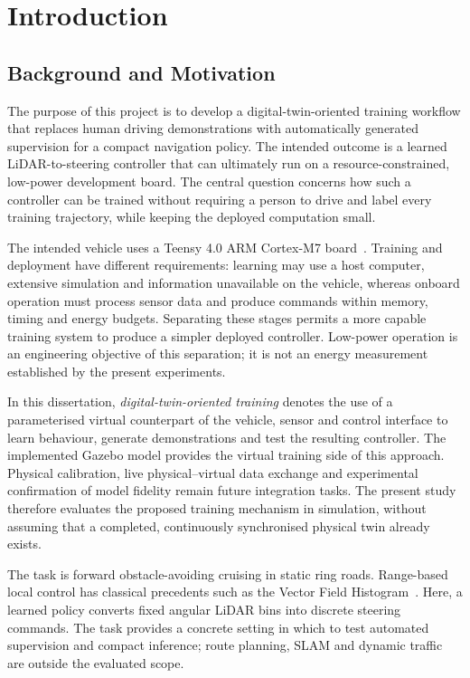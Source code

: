 \chapter{Introduction}
\label{ch:introduction}
\section{Background and Motivation}
The purpose of this project is to develop a digital-twin-oriented training
workflow that replaces human driving demonstrations with automatically generated
supervision for a compact navigation policy. The intended outcome is a learned
LiDAR-to-steering controller that can ultimately run on a resource-constrained,
low-power development board. The central question concerns how such a controller
can be trained without requiring a person to drive and label every training
trajectory, while keeping the deployed computation small.

The intended vehicle uses a Teensy 4.0 ARM Cortex-M7 board~\cite{pjrcTeensy40}.
Training and deployment have different requirements: learning may use a host
computer, extensive simulation and information unavailable on the vehicle,
whereas onboard operation must process sensor data and produce commands within
memory, timing and energy budgets. Separating these stages permits a more capable
training system to produce a simpler deployed controller. Low-power operation
is an engineering objective of this separation; it is not an energy measurement
established by the present experiments.

In this dissertation, \emph{digital-twin-oriented training} denotes the use of
a parameterised virtual counterpart of the vehicle, sensor and control interface
to learn behaviour, generate demonstrations and test the resulting controller.
The implemented Gazebo model provides the virtual training side of this approach.
Physical calibration, live physical--virtual data exchange and experimental
confirmation of model fidelity remain future integration tasks. The present
study therefore evaluates the proposed training mechanism in simulation, without
assuming that a completed, continuously synchronised physical twin already exists.

The task is forward obstacle-avoiding cruising in static ring roads. Range-based
local control has classical precedents such as the Vector Field Histogram~\cite{borenstein1991vfh}.
Here, a learned policy converts fixed angular LiDAR bins into discrete steering
commands. The task provides a concrete setting in which to test automated
supervision and compact inference; route planning, SLAM and dynamic traffic are
outside the evaluated scope.

